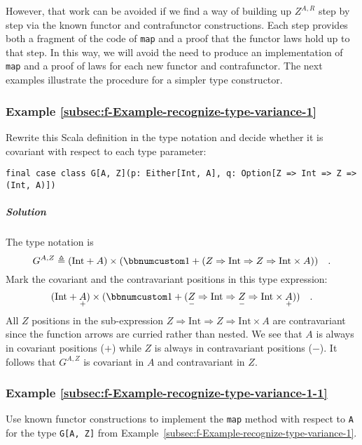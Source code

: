 However, that work can be avoided if we find a way of building up
$Z^{A,R}$ step by step via the known functor and contrafunctor constructions.
Each step provides both a fragment of the code of \lstinline!map!
and a proof that the functor laws hold up to that step. In this way,
we will avoid the need to produce an implementation of \lstinline!map!
and a proof of laws for each new functor and contrafunctor. The next
examples illustrate the procedure for a simpler type constructor.

\subsubsection{Example \label{subsec:f-Example-recognize-type-variance-1}\ref{subsec:f-Example-recognize-type-variance-1}}

Rewrite this Scala definition in the type notation and decide whether
it is covariant with respect to each type parameter:

\begin{lstlisting}
final case class G[A, Z](p: Either[Int, A], q: Option[Z => Int => Z => (Int, A)])
\end{lstlisting}


\subparagraph{Solution}

The type notation is
\[
G^{A,Z}\triangleq(\text{Int}+A)\times(\bbnum 1+(Z\Rightarrow\text{Int}\Rightarrow Z\Rightarrow\text{Int}\times A))\quad.
\]
Mark the covariant and the contravariant positions in this type expression:
\[
(\text{Int}+\underset{+}{A})\times(\bbnum 1+(\underset{-}{Z}\Rightarrow\text{Int}\Rightarrow\underset{-}{Z}\Rightarrow\text{Int}\times\underset{+}{A}))\quad.
\]
All $Z$ positions in the sub-expression $Z\Rightarrow\text{Int}\Rightarrow Z\Rightarrow\text{Int}\times A$
are contravariant since the function arrows are curried rather than
nested. We see that $A$ is always in covariant positions ($+$) while
$Z$ is always in contravariant positions ($-$). It follows that
$G^{A,Z}$ is covariant in $A$ and contravariant in $Z$. 

\subsubsection{Example \label{subsec:f-Example-recognize-type-variance-1-1}\ref{subsec:f-Example-recognize-type-variance-1-1}}

Use known functor constructions to implement the \lstinline!map!
method with respect to \lstinline!A! for the type \lstinline!G[A, Z]!
from Example~\ref{subsec:f-Example-recognize-type-variance-1}.

